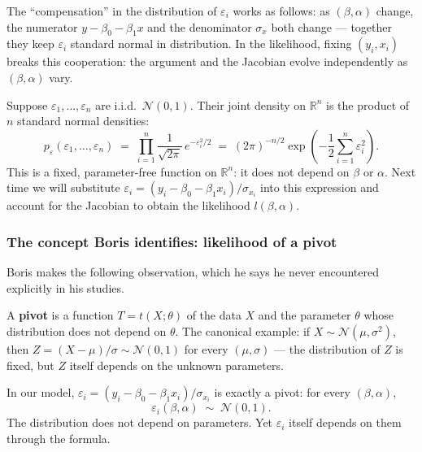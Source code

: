 \documentclass[a4paper,oneside,12pt]{extarticle}
\theoremstyle{plain}
\theoremstyle{definition}
\theoremstyle{remark}
\begin{document}
The ``compensation'' in the distribution of $\varepsilon_i$ works as
follows: as $(\beta,\alpha)$ change, the numerator $y-\beta_0-\beta_1
x$ and the denominator $\sigma_x$ both change — together they keep
$\varepsilon_i$ standard normal in distribution.  In the likelihood,
fixing $(y_i,x_i)$ breaks this cooperation: the argument and the
Jacobian evolve independently as $(\beta,\alpha)$ vary.



Suppose $\varepsilon_1, \ldots, \varepsilon_n$ are i.i.d.\ $\mathcal{N}(0,1)$.
Their joint density on $\mathbb{R}^n$ is the product of $n$ standard
normal densities:
\[
  p_\varepsilon(\varepsilon_1,\ldots,\varepsilon_n)
  \;=\;
  \prod_{i=1}^n \frac{1}{\sqrt{2\pi}}\,e^{-\varepsilon_i^2/2}
  \;=\;
  (2\pi)^{-n/2}\exp\!\left(-\frac{1}{2}\sum_{i=1}^n \varepsilon_i^2\right).
\]
This is a fixed, parameter-free function on $\mathbb{R}^n$: it does
not depend on $\beta$ or $\alpha$.  Next time we will substitute
$\varepsilon_i = (y_i - \beta_0 - \beta_1 x_i)/\sigma_{x_i}$ into
this expression and account for the Jacobian to obtain the likelihood
$l(\beta,\alpha)$.

\subsubsection*{The concept Boris identifies: likelihood of a pivot}

Boris makes the following observation, which he says he never
encountered explicitly in his studies.

A \textbf{pivot} is a function $T = t(X;\theta)$ of the data $X$ and
the parameter $\theta$ whose distribution does not depend on $\theta$.
The canonical example: if $X \sim \mathcal{N}(\mu,\sigma^2)$, then
$Z = (X-\mu)/\sigma \sim \mathcal{N}(0,1)$ for every $(\mu,\sigma)$
— the distribution of $Z$ is fixed, but $Z$ itself depends on the
unknown parameters.

In our model, $\varepsilon_i = (y_i - \beta_0 - \beta_1 x_i)/\sigma_{x_i}$
is exactly a pivot: for every $(\beta, \alpha)$,
\[
  \varepsilon_i(\beta,\alpha) \;\sim\; \mathcal{N}(0,1).
\]
The distribution does not depend on parameters.  Yet $\varepsilon_i$
itself depends on them through the formula.
\end{document}
